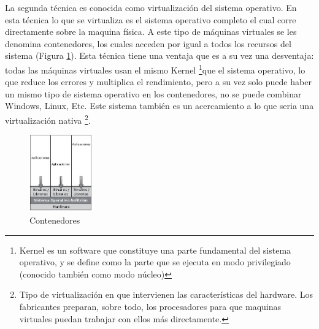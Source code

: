 \documentclass[conference, spanish]{IEEEtran}
\begin{document}
La segunda técnica es conocida como virtualización del sistema operativo. En esta técnica lo que se virtualiza es el sistema operativo completo el cual corre directamente sobre la maquina física. A este tipo de máquinas virtuales se les denomina contenedores, los cuales acceden por igual a todos los recursos del sistema (Figura \ref{fig:contenedores}). Esta técnica tiene una ventaja que es a su vez una desventaja: todas las máquinas virtuales usan el mismo Kernel \footnote{Kernel es un software que constituye una parte fundamental del sistema operativo, y se define como la parte que se ejecuta en modo privilegiado (conocido también como modo núcleo)}que el sistema operativo, lo que reduce los errores y multiplica el rendimiento, pero a su vez solo puede haber un mismo tipo de sistema operativo en los contenedores, no se puede combinar Windows, Linux, Etc. Este sistema también es un acercamiento a lo que seria una virtualización nativa \footnote{Tipo de virtualización en que intervienen las características del hardware. Los fabricantes preparan, sobre todo, los procesadores para que maquinas virtuales puedan trabajar con ellos más directamente.}.\\

\begin{figure}[h]
  \centering
  \includegraphics[width = 0.24\textwidth]{../architecture/v1/diagrams/contenedores}
  \caption{Contenedores}
  \label{fig:contenedores}  
\end{figure}

\newpage
\end{document}
